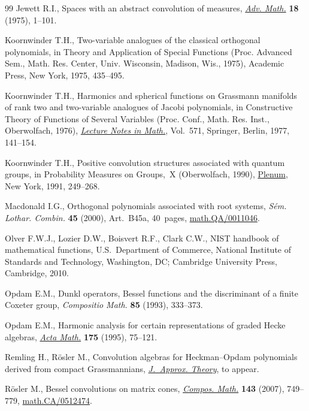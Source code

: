 \documentclass[11pt]{article}
\numberwithin{equation}{section}
\begin{document}
\begin{thebibliography}{99}
Jewett R.I., Spaces with an abstract convolution of measures, \href{http://dx.doi.org/10.1016/0001-8708(75)90002-X}{\textit{Adv.
  Math.}} \textbf{18} (1975), 1--101.

Koornwinder T.H., Two-variable analogues of the classical orthogonal
  polynomials, in Theory and Application of Special Functions ({P}roc.
  {A}dvanced {S}em., {M}ath. {R}es. {C}enter, {U}niv. {W}isconsin, {M}adison,
  {W}is., 1975), Academic Press, New York, 1975, 435--495.

Koornwinder T.H., Harmonics and spherical functions on {G}rassmann manifolds of
  rank two and two-variable analogues of {J}acobi polynomials, in Constructive
  Theory of Functions of Several Variables ({P}roc. {C}onf., {M}ath. {R}es.
  {I}nst., {O}berwolfach, 1976), \href{http://dx.doi.org/10.1007/BFb0086570}{\textit{Lecture Notes in Math.}}, Vol.~571,
  Springer, Berlin, 1977, 141--154.

Koornwinder T.H., Positive convolution structures associated with quantum
  groups, in Probability Measures on Groups,~{X} ({O}berwolfach, 1990), \href{http://dx.doi.org/10.1007/978-1-4899-2364-6_18}{Plenum},
  New York, 1991, 249--268.

Macdonald I.G., Orthogonal polynomials associated with root systems,
  \textit{S\'em. Lothar. Combin.} \textbf{45} (2000), Art.~B45a, 40~pages,
  \href{http://arxiv.org/abs/math.QA/0011046}{math.QA/0011046}.

Olver F.W.J., Lozier D.W., Boisvert R.F., Clark C.W., N{IST} handbook of
  mathematical functions, U.S.~Department of Commerce, National Institute of
  Standards and Technology, Washington, DC; Cambridge University Press,
  Cambridge, 2010.

Opdam E.M., Dunkl operators, {B}essel functions and the discriminant of a
  f\/inite {C}oxeter group, \textit{Compositio Math.} \textbf{85} (1993),
  333--373.

Opdam E.M., Harmonic analysis for certain representations of graded {H}ecke
  algebras, \href{http://dx.doi.org/10.1007/BF02392487}{\textit{Acta Math.}} \textbf{175} (1995), 75--121.

Remling H., R\"osler M., Convolution algebras for Heckman--Opdam polynomials
  derived from compact Grassmannians, \href{http://dx.doi.org/10.1016/j.jat.2014.07.005}{\textit{J.~Approx. Theory}}, {t}o appear.

R{\"o}sler M., Bessel convolutions on matrix cones, \href{http://dx.doi.org/10.1112/S0010437X06002594}{\textit{Compos. Math.}}
  \textbf{143} (2007), 749--779, \href{http://arxiv.org/abs/math.CA/0512474}{math.CA/0512474}.


\end{thebibliography}
\end{document}
